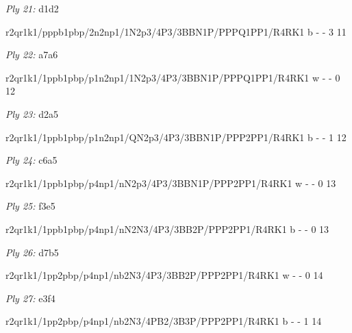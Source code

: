 \documentclass{article}
\begin{document}
\bigskip

\emph{Ply 21:} d1d2


r2qr1k1/pppb1pbp/2n2np1/1N2p3/4P3/3BBN1P/PPPQ1PP1/R4RK1 b - - 3 11


\showboard

\bigskip

\emph{Ply 22:} a7a6

r2qr1k1/1ppb1pbp/p1n2np1/1N2p3/4P3/3BBN1P/PPPQ1PP1/R4RK1 w - - 0 12


\showboard

\bigskip

\emph{Ply 23:} d2a5


r2qr1k1/1ppb1pbp/p1n2np1/QN2p3/4P3/3BBN1P/PPP2PP1/R4RK1 b - - 1 12


\showboard

\bigskip

\emph{Ply 24:} c6a5

r2qr1k1/1ppb1pbp/p4np1/nN2p3/4P3/3BBN1P/PPP2PP1/R4RK1 w - - 0 13


\showboard

\bigskip

\emph{Ply 25:} f3e5


r2qr1k1/1ppb1pbp/p4np1/nN2N3/4P3/3BB2P/PPP2PP1/R4RK1 b - - 0 13


\showboard

\bigskip

\emph{Ply 26:} d7b5

r2qr1k1/1pp2pbp/p4np1/nb2N3/4P3/3BB2P/PPP2PP1/R4RK1 w - - 0 14


\showboard

\bigskip

\emph{Ply 27:} e3f4


r2qr1k1/1pp2pbp/p4np1/nb2N3/4PB2/3B3P/PPP2PP1/R4RK1 b - - 1 14

\end{document}

